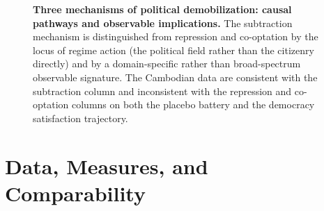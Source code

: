 \documentclass[
  12pt,
  letterpaper]{article}
\begin{document}
\begin{figure}[!htbp]
\caption{\textbf{Three mechanisms of political demobilization: causal pathways and observable implications.}
The subtraction mechanism is distinguished from repression and co-optation by the locus of regime action
(the political field rather than the citizenry directly) and by a domain-specific rather than broad-spectrum
observable signature. The Cambodian data are consistent with the subtraction column and inconsistent with the
repression and co-optation columns on both the placebo battery and the democracy satisfaction trajectory.}
\label{fig:mechanisms}
\end{figure}

\section{Data, Measures, and
Comparability}\label{data-measures-and-comparability}
\end{document}

